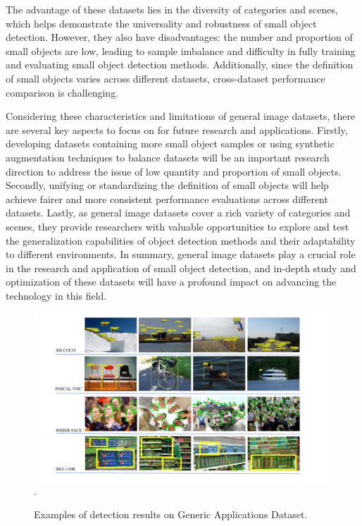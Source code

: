 \documentclass[journal]{IEEEtran}
\begin{document}
The advantage of these datasets lies in the diversity of categories and scenes, which helps demonstrate the universality and robustness of small object detection. However, they also have disadvantages: the number and proportion of small objects are low, leading to sample imbalance and difficulty in fully training and evaluating small object detection methods. Additionally, since the definition of small objects varies across different datasets, cross-dataset performance comparison is challenging.

Considering these characteristics and limitations of general image datasets, there are several key aspects to focus on for future research and applications. Firstly, developing datasets containing more small object samples or using synthetic augmentation techniques to balance datasets will be an important research direction to address the issue of low quantity and proportion of small objects. Secondly, unifying or standardizing the definition of small objects will help achieve fairer and more consistent performance evaluations across different datasets. Lastly, as general image datasets cover a rich variety of categories and scenes, they provide researchers with valuable opportunities to explore and test the generalization capabilities of object detection methods and their adaptability to different environments. In summary, general image datasets play a crucial role in the research and application of small object detection, and in-depth study and optimization of these datasets will have a profound impact on advancing the technology in this field.

\begin{figure}[htbp]
	\centering
	\setlength{\abovecaptionskip}{-0.6cm}
	\includegraphics[width=\textwidth]{fig 10}
	\DeclareGraphicsExtensions.
	\caption{Examples of detection results on Generic Applications Dataset.}
	\label{fig 1}
\end{figure}
\end{document}
